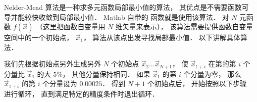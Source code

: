 

Nelder-Mead 算法是一种求多元函数局部最小值的算法， 其优点是不需要函数可导并能较快收敛到局部最小值． Matlab 自带的  函数就是使用该算法． 对 $N$ 元函数 $f(\vec x)$ （这里把函数自变量用 $N$ 维矢量来表示）， 该算法需要提供函数自变量空间中的一个初始点， $\vec x_1$， 算法从该点出发寻找局部最小值． 以下讲解具体算法．

我们先根据初始点另外生成另外 $N$ 个初始点 $\vec x_2\dots\vec x_{N + 1}$， 使 $\vec x_{1 + i}$ 在第的第 $i$ 个分量比 $\vec x_1$ 的大 5\%， 其他分量保持相同． 如果 $\vec x_1$ 的第 $i$ 个分量为零， 那么 $\vec x_{1 + i}$ 的第 $i$ 个分量设为 $0.00025$． 得到 $N+1$ 个初始点后， 开始按照以下步骤进行循环， 直到满足特定的精度条件时退出循环．

